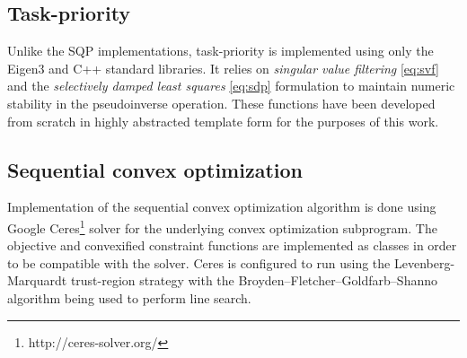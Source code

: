\documentclass[times, utf8, diplomski, english]{fer}
\begin{document}
\subsection{Task-priority}
Unlike the SQP implementations, task-priority is implemented using only the Eigen3 and C++ standard libraries.
It relies on \textit{singular value filtering} \eqref{eq:svf} and the \textit{selectively damped least squares} \eqref{eq:sdp} formulation to maintain numeric stability in the pseudoinverse operation.
These functions have been developed from scratch in highly abstracted template form for the purposes of this work.

\subsection{Sequential convex optimization}
Implementation of the sequential convex optimization algorithm is done using Google Ceres\footnote{http://ceres-solver.org/} solver for the underlying convex optimization subprogram.
The objective and convexified constraint functions are implemented as classes in order to be compatible with the solver.
Ceres is configured to run using the Levenberg-Marquardt trust-region strategy with the Broyden–Fletcher–Goldfarb–Shanno algorithm being used to perform line search.
\end{document}
